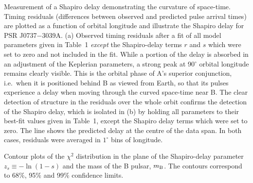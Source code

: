\documentclass[12pt,psfig]{article}
\begin{document}
 Measurement of a Shapiro delay demonstrating the 
curvature of space-time.  Timing residuals (differences between observed and
predicted pulse arrival times) are plotted as a function of orbital longitude
and illustrate the Shapiro delay for PSR J0737$-$3039A. (a) Observed timing
residuals after a fit of all model parameters given in Table~1 {\em except}
the Shapiro-delay terms $r$ and $s$ which were set to zero and not included in
the fit. While a portion of the delay is absorbed in an adjustment of the
Keplerian parameters, a strong peak at 90$^\circ$ orbital longitude remains
clearly visible. This is the orbital phase of A's superior conjunction,
i.e.~when it is positioned behind B as viewed from Earth, so that its pulses
experience a delay when moving through the curved space-time near
B. The clear detection of structure in the residuals over the whole orbit
confirms the detection of the Shapiro delay, which is isolated in (b) by
holding all parameters to their best-fit values given in Table~1, except the
Shapiro delay terms which were set to zero.  The line shows the predicted
delay at the centre of the data span. In both cases, residuals were averaged
in $1^\circ$ bins of longitude.



Contour plots of the $\chi^2$ distribution in the plane of
the Shapiro-delay parameter $z_s \equiv -\ln(1-s)$ and the mass of the
B pulsar, $m_{\rm{B}}$. The contours correspond to 68\%, 95\% and 99\%
confidence limits. 





\clearpage
\end{document}
